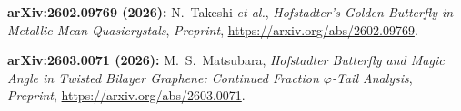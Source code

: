 
\noindent\textbf{arXiv:2602.09769 (2026):} N.~Takeshi \textit{et al.}, \textit{Hofstadter's Golden Butterfly in Metallic Mean Quasicrystals}, \textit{Preprint}, \url{https://arxiv.org/abs/2602.09769}.

\noindent\textbf{arXiv:2603.0071 (2026):} M.~S.~Matsubara, \textit{Hofstadter Butterfly and Magic Angle in Twisted Bilayer Graphene: Continued Fraction $\varphi$-Tail Analysis}, \textit{Preprint}, \url{https://arxiv.org/abs/2603.0071}.
